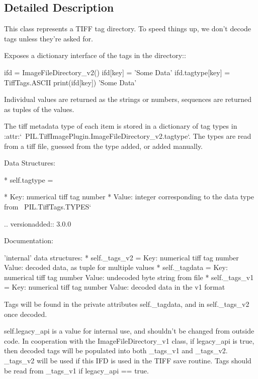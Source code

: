 \subsection{Detailed Description}
\begin{DoxyVerb}This class represents a TIFF tag directory.  To speed things up, we
don't decode tags unless they're asked for.

Exposes a dictionary interface of the tags in the directory::

    ifd = ImageFileDirectory_v2()
    ifd[key] = 'Some Data'
    ifd.tagtype[key] = TiffTags.ASCII
    print(ifd[key])
    'Some Data'

Individual values are returned as the strings or numbers, sequences are
returned as tuples of the values.

The tiff metadata type of each item is stored in a dictionary of
tag types in
:attr:`~PIL.TiffImagePlugin.ImageFileDirectory_v2.tagtype`. The types
are read from a tiff file, guessed from the type added, or added
manually.

Data Structures:

    * self.tagtype = {}

      * Key: numerical tiff tag number
      * Value: integer corresponding to the data type from
               ~PIL.TiffTags.TYPES`

.. versionadded:: 3.0.0
\end{DoxyVerb}
\begin{DoxyVerb}Documentation:

    'internal' data structures:
    * self._tags_v2 = {} Key: numerical tiff tag number
                         Value: decoded data, as tuple for multiple values
    * self._tagdata = {} Key: numerical tiff tag number
                         Value: undecoded byte string from file
    * self._tags_v1 = {} Key: numerical tiff tag number
                         Value: decoded data in the v1 format

Tags will be found in the private attributes self._tagdata, and in
self._tags_v2 once decoded.

self.legacy_api is a value for internal use, and shouldn't be
changed from outside code. In cooperation with the
ImageFileDirectory_v1 class, if legacy_api is true, then decoded
tags will be populated into both _tags_v1 and _tags_v2. _tags_v2
will be used if this IFD is used in the TIFF save routine. Tags
should be read from _tags_v1 if legacy_api == true.\end{DoxyVerb}
 

